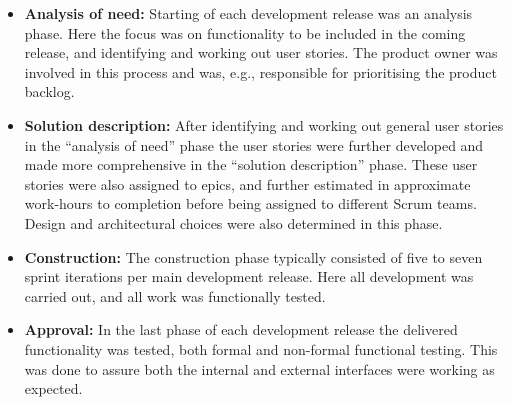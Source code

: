 \begin{itemize}
   \item \textbf{Analysis of need:} Starting of each development release was an analysis phase. Here the focus was on functionality to be included in the coming release, and identifying and working out user stories. The product owner was involved in this process and was, e.g., responsible for prioritising the product backlog.
   \item \textbf{Solution description:} After identifying and working out general user stories in the ``analysis of need'' phase the user stories were further developed and made more comprehensive in the ``solution description'' phase. These user stories were also assigned to epics, and further estimated in approximate work-hours to completion before being assigned to different Scrum teams. Design and architectural choices were also determined in this phase.
   \item \textbf{Construction:} The construction phase typically consisted of five to seven sprint iterations per main development release. Here all development was carried out, and all work was functionally tested.
   \item \textbf{Approval:} In the last phase of each development release the delivered functionality was tested, both formal and non-formal functional testing. This was done to assure both the internal and external interfaces were working as expected.
\end{itemize}

